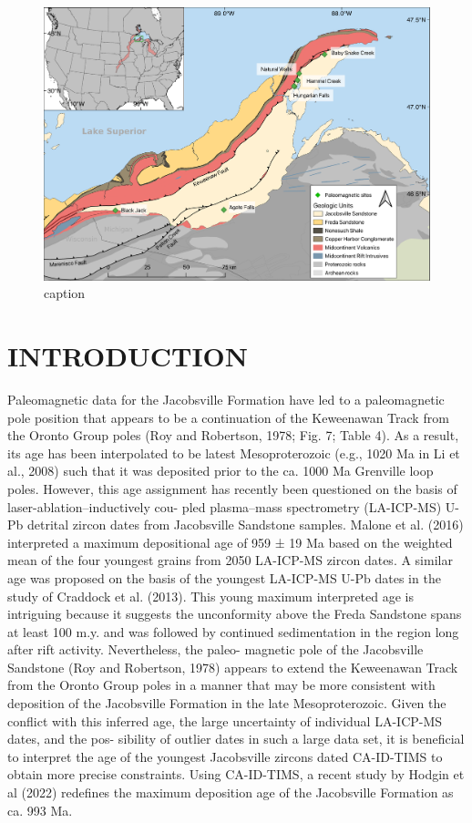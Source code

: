 \documentclass[draft]{agujournal2019}
\begin{document}
\begin{figure}
\noindent\includegraphics[width=\textwidth]{../Figures/Geologic_map.pdf}
\caption{caption}
\label{pngfiguresample}
\end{figure}

\section*{INTRODUCTION}

Paleomagnetic data for the Jacobsville Formation have led to a paleomagnetic pole position that appears to be a continuation of the Keweenawan Track from the Oronto Group poles (Roy and Robertson, 1978; Fig. 7; Table 4). As a result, its age has been interpolated to be latest Mesoproterozoic (e.g., 1020 Ma in Li et al., 2008) such that it was deposited prior to the ca. 1000 Ma Grenville loop poles. However, this age assignment has recently been questioned on the basis of laser-ablation–inductively cou- pled plasma–mass spectrometry (LA-ICP-MS) U-Pb detrital zircon dates from Jacobsville Sandstone samples. Malone et al. (2016) interpreted a maximum depositional age of 959 ± 19 Ma based on the weighted mean of the four youngest grains from 2050 LA-ICP-MS zircon dates. A similar age was proposed on the basis of the youngest LA-ICP-MS U-Pb dates in the study of Craddock et al. (2013). This young maximum interpreted age is intriguing because it suggests the unconformity above the Freda Sandstone spans at least 100 m.y. and was followed by continued sedimentation in the region long after rift activity. Nevertheless, the paleo- magnetic pole of the Jacobsville Sandstone (Roy and Robertson, 1978) appears to extend the Keweenawan Track from the Oronto Group poles in a manner that may be more consistent with deposition of the Jacobsville Formation in the late Mesoproterozoic. Given the conflict with this inferred age, the large uncertainty of individual LA-ICP-MS dates, and the pos- sibility of outlier dates in such a large data set, it is beneficial to interpret the age of the youngest Jacobsville zircons dated CA-ID-TIMS to obtain more precise constraints. Using CA-ID-TIMS, a recent study by Hodgin et al (2022) redefines the maximum deposition age of the Jacobsville Formation as ca. 993 Ma.
\end{document}
